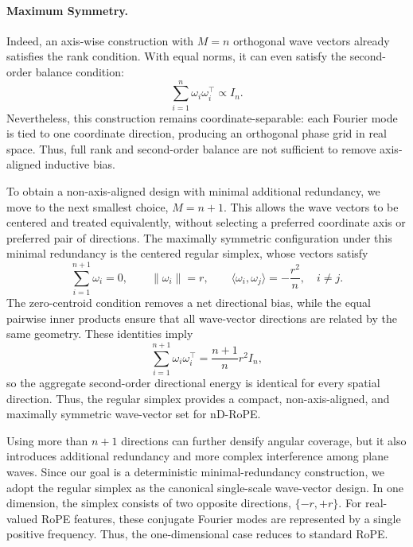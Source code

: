 \documentclass{article}
\theoremstyle{plain}
\theoremstyle{definition}
\theoremstyle{remark}
\begin{document}
\paragraph{Maximum Symmetry.}
Indeed, an axis-wise construction with $M=n$ orthogonal wave vectors already satisfies the rank condition. With equal norms, it can even satisfy the second-order balance condition:
\begin{equation}
    \sum_{i=1}^{n}\omega_i\omega_i^\top \propto I_n .
\end{equation}
Nevertheless, this construction remains coordinate-separable: each Fourier mode is tied to one coordinate direction, producing an orthogonal phase grid in real space. Thus, full rank and second-order balance are not sufficient to remove axis-aligned inductive bias.

To obtain a non-axis-aligned design with minimal additional redundancy, we move to the next smallest choice, $M=n+1$. 
This allows the wave vectors to be centered and treated equivalently, without selecting a preferred coordinate axis or preferred pair of directions. 
The maximally symmetric configuration under this minimal redundancy is the centered regular simplex, whose vectors satisfy
\begin{equation}
    \sum_{i=1}^{n+1}\omega_i=0,\qquad
    \|\omega_i\|=r,\qquad
    \langle\omega_i,\omega_j\rangle=-\frac{r^2}{n},\quad i\neq j.
\end{equation}
The zero-centroid condition removes a net directional bias, while the equal pairwise inner products ensure that all wave-vector directions are related by the same geometry. 
These identities imply
\begin{equation}
    \sum_{i=1}^{n+1}\omega_i\omega_i^\top
    =
    \frac{n+1}{n}r^2 I_n,
\end{equation}
so the aggregate second-order directional energy is identical for every spatial direction. Thus, the regular simplex provides a compact, non-axis-aligned, and maximally symmetric wave-vector set for nD-RoPE.

Using more than $n+1$ directions can further densify angular coverage, but it also introduces additional redundancy and more complex interference among plane waves. Since our goal is a deterministic minimal-redundancy construction, we adopt the regular simplex as the canonical single-scale wave-vector design. In one dimension, the simplex consists of two opposite directions, $\{-r,+r\}$. 
For real-valued RoPE features, these conjugate Fourier modes are represented by a single positive frequency. Thus, the one-dimensional case reduces to standard RoPE.
\end{document}
